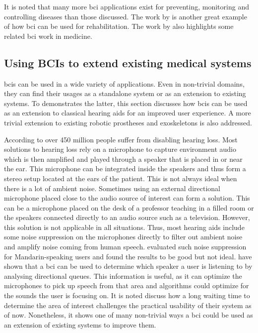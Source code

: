 It is noted that many more \gls{bci} applications exist for preventing, monitoring and controlling diseases than those discussed.
The work by \citet{parkinson_stroke_reduction} is another great example of how \gls{bci} can be used for rehabilitation.
The work by \citet{bci_in_medicine} also highlights some related \gls{bci} work in medicine.


\subsection{Using BCIs to extend existing medical systems}
\label{subsec:bci_common_use_casesextending_medical_system}

\Glspl{bci} can be used in a wide variety of applications.
Even in non-trivial domains, they can find their usages as a standalone system or as an extension to existing systems.
To demonstrates the latter, this section discusses how \glspl{bci} can be used as an extension to classical hearing aids for an improved user experience.
A more trivial extension to existing robotic prostheses and exoskeletons is also addressed.


According to \citet{hearing_aids_noise_reduction} over 450 million people suffer from disabling hearing loss.
Most solutions to hearing loss rely on a microphone to capture environment audio which is then amplified and played through a speaker that is placed in or near the ear.
This microphone can be integrated inside the speakers and thus form a stereo setup located at the ears of the patient.
This is not always ideal when there is a lot of ambient noise.
Sometimes using an external directional microphone placed close to the audio source of interest can form a solution.
This can be a microphone placed on the desk of a professor teaching in a filled room or the speakers connected directly to an audio source such as a television.
However, this solution is not applicable in all situations.
Thus, most hearing aids include some noise suppression on the microphones directly to filter out ambient noise and amplify noise coming from human speech.
 evaluated such noise suppression for Mandarin-speaking users and found the results to be good but not ideal.
 have shown that a \gls{bci} can be used to determine which speaker a user is listening to by analysing directional queues.
This information is useful, as it can optimize the microphones to pick up speech from that area and algorithms could optimize for the sounds the user is focusing on.
It is noted \citet{bci_hearing_aid_direction} discuss how a long waiting time to determine the area of interest challenges the practical usability of their system as of now.
Nonetheless, it shows one of many non-trivial ways a \gls{bci} could be used as an extension of existing systems to improve them.

